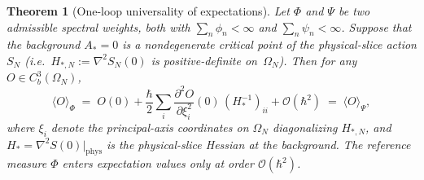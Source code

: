 \documentclass[12pt,a4paper]{article}
\theoremstyle{plain}
\newtheorem{theorem}{Theorem}[section]
\theoremstyle{definition}
\theoremstyle{remark}
\newcommand{\order}{\mathcal{O}}
\begin{document}
\begin{theorem}[One-loop universality of expectations]
\label{thm:one-loop-universality}
Let $\Phi$ and $\Psi$ be two admissible spectral weights, both with
$\sum_n \phi_n < \infty$ and $\sum_n \psi_n < \infty$.
Suppose that the background $A_* = 0$ is a nondegenerate critical
point of the physical-slice action $S_N$ (i.e.\ $H_{*,N} :=
\nabla^2 S_N(0)$ is positive-definite on~$\Omega_N$).
Then for any $O \in C^3_b(\Omega_N)$,
\begin{equation}\label{eq:one-loop-univ}
  \langle O \rangle_\Phi
  \;=\; O(0)
  + \frac{\hbar}{2}\sum_i \frac{\partial^2 O}{\partial \xi_i^2}(0)\,
    (H_*^{-1})_{ii}
  + \order(\hbar^2)
  \;=\; \langle O \rangle_\Psi,
\end{equation}
where $\xi_i$ denote the principal-axis coordinates on $\Omega_N$
diagonalizing $H_{*,N}$, and
$H_* = \nabla^2 S(0)|_{\mathrm{phys}}$ is the physical-slice
Hessian at the background.  The reference measure $\Phi$ enters
expectation values only at order $\order(\hbar^2)$.
\end{theorem}
\end{document}

